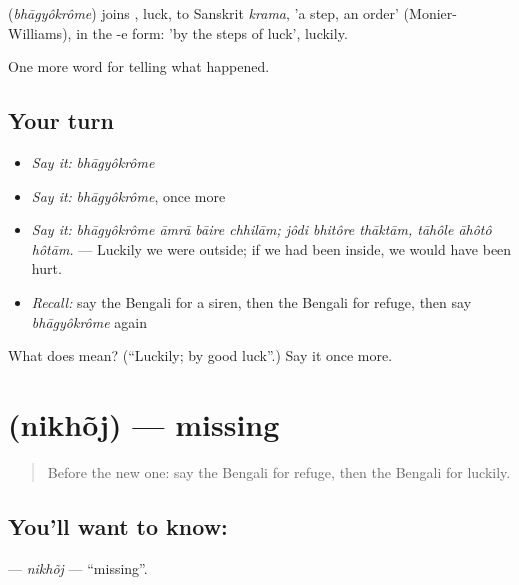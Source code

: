 \begin{cousinweb}
\textbf{} (\emph{bhāgyôkrôme}) joins \textbf{}, luck, to Sanskrit \emph{krama}, 'a step, an order' (Monier-Williams), in the -e form: 'by the steps of luck', luckily.
\end{cousinweb}

\begin{grammarlens}[title={What you've built}]
One more word for telling what happened.
\end{grammarlens}

\subsection*{Your turn}
\begin{itemize}
\raggedright
  \item \emph{Say it:} \emph{bhāgyôkrôme}
  \item \emph{Say it:} \emph{bhāgyôkrôme}, once more
  \item \emph{Say it:} \emph{bhāgyôkrôme āmrā bāire chhilām; jôdi bhitôre thāktām, tāhôle āhôtô hôtām.} — Luckily we were outside; if we had been inside, we would have been hurt.
  \item \emph{Recall:} say the Bengali for a siren, then the Bengali for refuge, then say \emph{bhāgyôkrôme} again
\end{itemize}

\begin{tcolorbox}[breakable,colback=teal!4,colframe=teal!35!black,title={Before you move on}]
What does  mean? (\textquotedblleft{}Luckily; by good luck\textquotedblright{}.) Say it once more.
\end{tcolorbox}
\section[\texorpdfstring{\bn{নিখোঁজ} (nikhõj)}{নিখোঁজ (nikhõj)}]{ (nikhõj) — missing}

\label{lesson:BN-C281-nikhoj}



\begin{quote}
Before the new one: say the Bengali for refuge, then the Bengali for luckily.
\end{quote}

\subsection*{You'll want to know: }
\textbf{} — \emph{nikhõj} — \textquotedblleft{}missing\textquotedblright{}.

